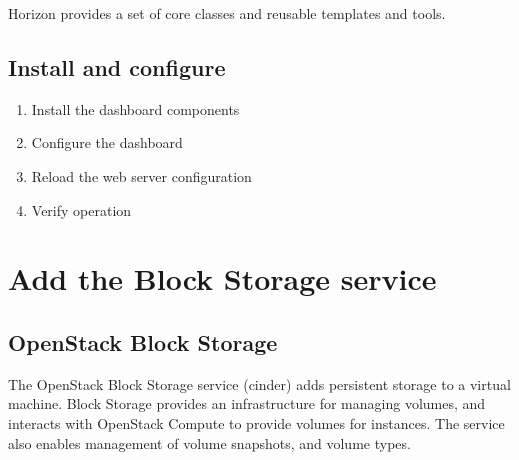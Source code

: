     \par Horizon provides a set of core classes and reusable templates and tools.
    \subsection{Install and configure}
        \begin{enumerate}
            \item Install the dashboard components
            \item Configure the dashboard
            \item Reload the web server configuration
            \item Verify operation
        \end{enumerate}
        
        
\section{Add the Block Storage service}

    \subsection{OpenStack Block Storage}
    
        \par The OpenStack Block Storage service (cinder) adds persistent storage to a virtual machine. Block Storage provides an infrastructure for managing volumes, and interacts with OpenStack Compute to provide volumes for instances. The service also enables management of volume snapshots, and volume types.
        
